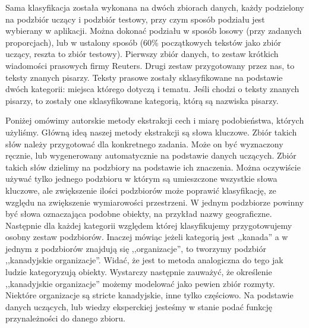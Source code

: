 \documentclass[a4paper]{classrep}
\begin{document}
Sama klasyfikacja została wykonana na dwóch zbiorach danych, każdy podzielony na podzbiór uczący i podzbiór testowy, przy czym sposób podziału jest wybierany w aplikacji.
Można dokonać podziału w sposób losowy (przy zadanych proporcjach), lub w ustalony sposób (60\% początkowych tekstów jako zbiór uczący, reszta to zbiór testowy).
Pierwszy zbiór danych, to zestaw krótkich wiadomości prasowych firmy Reuters. Drugi zestaw przygotowany przez nas, to teksty znanych pisarzy. Teksty prasowe zostały
sklasyfikowane na podstawie dwóch kategorii: miejsca którego dotyczą i tematu. Jeśli chodzi o teksty znanych pisarzy, to zostały one sklasyfikowane kategorią, którą są nazwiska pisarzy.

Poniżej omówimy autorskie metody ekstrakcji cech i miarę podobieństwa, których użyliśmy. 
Główną ideą naszej metody ekstrakcji są słowa kluczowe. Zbiór takich słów należy przygotować dla konkretnego zadania. Może on być wyznaczony ręcznie,
lub wygenerowany automatycznie na podstawie danych uczących. Zbiór takich słów dzielimy na podzbiory na podstawie ich znaczenia. Można oczywiście używać tylko jednego podzbioru
w którym są umieszczone wszystkie słowa kluczowe, ale zwiększenie ilości podzbiorów może poprawić klasyfikację, ze względu na zwiększenie wymiarowości przestrzeni. 
W jednym podzbiorze powinny być słowa oznaczająca podobne obiekty, na przykład nazwy geograficzne. Następnie dla każdej kategorii względem której klasyfikujemy przygotowujemy
osobny zestaw podzbiorów. Inaczej mówiąc jeżeli kategorią jest ,,kanada'' a w jednym z podzbiorów znajdują się ,,organizacje'', to tworzymy podzbiór ,,kanadyjskie organizacje''.
Widać, że jest to metoda analogiczna do tego jak ludzie kategoryzują obiekty. Wystarczy następnie zauważyć, że określenie ,,kanadyjskie organizacje'' możemy modelować
jako pewien zbiór rozmyty. Niektóre organizacje są stricte kanadyjskie, inne tylko częściowo. Na podstawie danych uczących, lub wiedzy eksperckiej jesteśmy w stanie podać
funkcję przynależności do danego zbioru.
\end{document}
